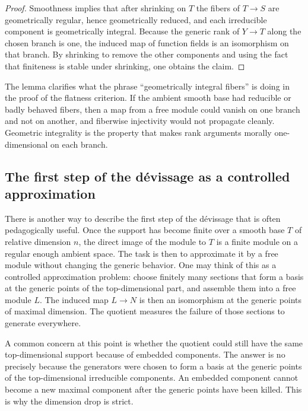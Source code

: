 \documentclass[11pt,oneside]{article}
\begin{document}
\begin{proof}
Smoothness implies that after shrinking on $T$ the fibers of $T\to S$ are geometrically regular, hence geometrically reduced, and each irreducible component is geometrically integral.  Because the generic rank of $Y\to T$ along the chosen branch is one, the induced map of function fields is an isomorphism on that branch.  By shrinking to remove the other components and using the fact that finiteness is stable under shrinking, one obtains the claim.
\end{proof}

The lemma clarifies what the phrase \enquote{geometrically integral fibers} is doing in the proof of the flatness criterion.  If the ambient smooth base had reducible or badly behaved fibers, then a map from a free module could vanish on one branch and not on another, and fiberwise injectivity would not propagate cleanly.  Geometric integrality is the property that makes rank arguments morally one-dimensional on each branch.

\subsection{The first step of the d\'evissage as a controlled approximation}

There is another way to describe the first step of the d\'evissage that is often pedagogically useful.  Once the support has become finite over a smooth base $T$ of relative dimension $n$, the direct image of the module to $T$ is a finite module on a regular enough ambient space.  The task is then to approximate it by a free module without changing the generic behavior.  One may think of this as a controlled approximation problem: choose finitely many sections that form a basis at the generic points of the top-dimensional part, and assemble them into a free module $L$.  The induced map $L\to N$ is then an isomorphism at the generic points of maximal dimension.  The quotient measures the failure of those sections to generate everywhere.

A common concern at this point is whether the quotient could still have the same top-dimensional support because of embedded components.  The answer is no precisely because the generators were chosen to form a basis at the generic points of the top-dimensional irreducible components.  An embedded component cannot become a new maximal component after the generic points have been killed.  This is why the dimension drop is strict.
\end{document}
